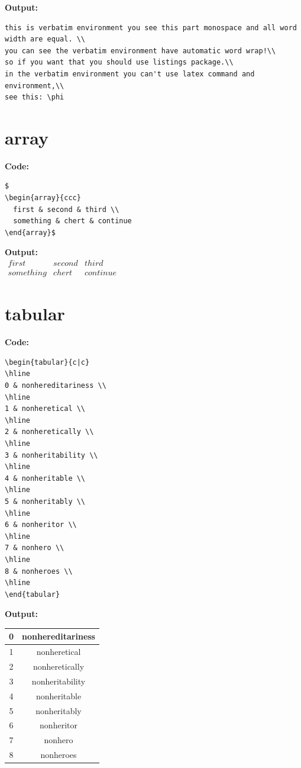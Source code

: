 \documentclass{book}
\newcommand{\myc}{\noindent\textbf{{\color{blue} Code}:}}
\newcommand{\myo}{\noindent\textbf{{\color{blue} Output}:\\}}
\begin{document}
\myo
\begin{verbatim}
this is verbatim environment you see this part monospace and all word width are equal. \\
you can see the verbatim environment have automatic word wrap!\\
so if you want that you should use listings package.\\
in the verbatim environment you can't use latex command and environment,\\
see this: \phi
\end{verbatim}

\section{array}
\myc
\begin{lstlisting}
$
\begin{array}{ccc}
  first & second & third \\
  something & chert & continue
\end{array}$
\end{lstlisting}
\myo
$
\begin{array}{ccc}
  first & second & third \\
  something & chert & continue
\end{array}
$





\section{tabular}
\myc
\begin{lstlisting}
\begin{tabular}{c|c}
\hline
0 & nonhereditariness \\
\hline
1 & nonheretical \\
\hline
2 & nonheretically \\
\hline
3 & nonheritability \\
\hline
4 & nonheritable \\
\hline
5 & nonheritably \\
\hline
6 & nonheritor \\
\hline
7 & nonhero \\
\hline
8 & nonheroes \\
\hline
\end{tabular}
\end{lstlisting}

\myo
\begin{tabular}{c|c}
\hline
0 & nonhereditariness \\
\hline
1 & nonheretical \\
\hline
2 & nonheretically \\
\hline
3 & nonheritability \\
\hline
4 & nonheritable \\
\hline
5 & nonheritably \\
\hline
6 & nonheritor \\
\hline
7 & nonhero \\
\hline
8 & nonheroes \\
\hline
\end{tabular}
\end{document}
